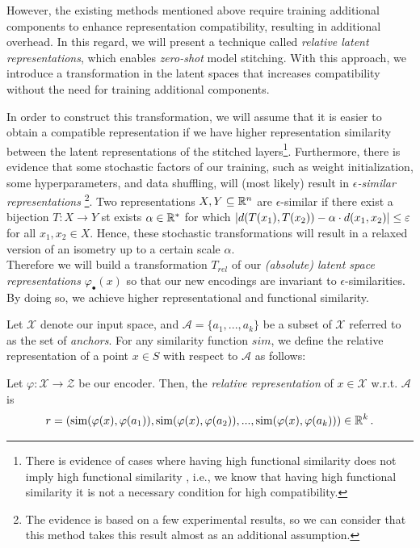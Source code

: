 \documentclass[../main.tex]{subfiles}
\begin{document}
However, the existing methods mentioned above require training additional components to enhance representation compatibility, resulting in additional overhead. In this regard, we will present a technique called \emph{relative latent representations}, which enables \emph{zero-shot} model stitching. With this approach, we introduce a transformation in the latent spaces that increases compatibility without the need for training additional components.

In order to construct this transformation, we will assume that it is easier to obtain a compatible representation if we have higher representation similarity between the latent representations of the stitched layers\footnote{There is evidence of cases where having high functional similarity does not imply high functional similarity \cite{csiszarik_similarity_2021}, i.e., we know that having high functional similarity it is not a necessary condition for high compatibility.}. Furthermore, there is evidence that some stochastic factors of our training, such as weight initialization, some hyperparameters, and data shuffling, will (most likely) result in \emph{$\epsilon$-similar representations} \cite{moschella_relative_2022}\footnote{The evidence is based on a few experimental results, so we can consider that this method takes this result almost as an additional assumption.}. Two representations $X,Y \subseteq \mathbb{R}^n$ are $\epsilon$-similar if there exist a bijection $T:X \to Y$ st exists $\alpha \in \mathbb{R}^*$ for which $\left\lvert d(T(x_1), T(x_2)) - \alpha \cdot d(x_1,x_2) \right\rvert \leq \varepsilon$ for all $x_1,x_2 \in X$. Hence, these stochastic transformations will result in a relaxed version of an isometry up to a certain scale $\alpha$.\\

Therefore we will build a transformation $T_{rel}$ of our \emph{(absolute) latent space representations} $\varphi_\bullet(x)$ so that our new encodings are invariant to $\epsilon$-similarities. By doing so, we achieve higher representational and functional similarity.

Let $\mathcal{X}$ denote our input space, and $\mathcal{A} = \{a_1, ..., a_k\}$ be a subset of $\mathcal{X}$ referred to as the set of \emph{anchors}. For any similarity function $sim$, we define the relative representation of a point $x \in S$ with respect to $\mathcal{A}$ as follows:

\begin{definition}
Let $\varphi:\mathcal{X} \to \mathcal{Z}$ be our encoder. Then, the \emph{relative representation} of $x \in \mathcal{X}$ w.r.t. $\mathcal{A}$ is
\[
r = (\text{sim}(\varphi(x), \varphi(a_1)), \text{sim}(\varphi(x), \varphi(a_2)), ..., \text{sim}(\varphi(x), \varphi(a_k))) \in \mathbb{R}^k\,.
\]
\end{definition}
\end{document}
